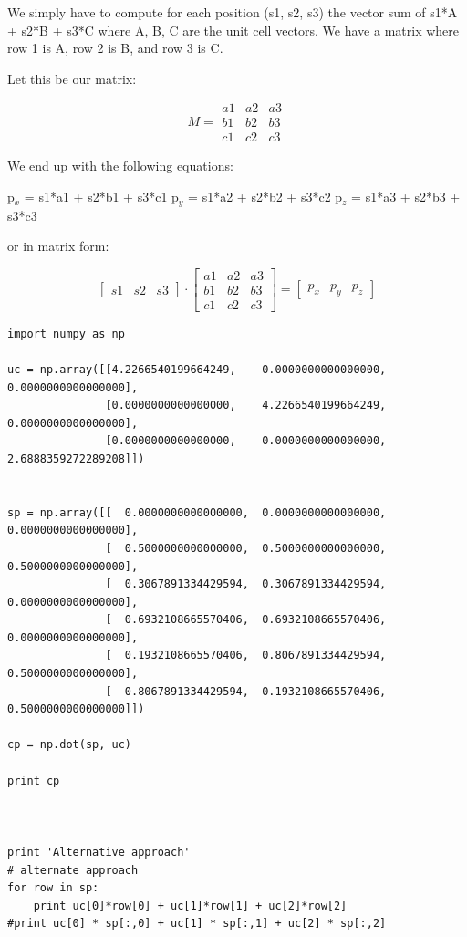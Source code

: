 \documentclass{article}
\begin{document}
We simply have to compute for each position (s1, s2, s3) the vector sum of s1*A + s2*B + s3*C where A, B, C are the unit cell vectors. We have a matrix where row 1 is A, row 2 is B, and row 3 is C.

Let this be our matrix:

\[M = \begin{array}{ccc} a1 & a2 & a3 \\
                       b1 & b2 & b3 \\
                       c1 & c2 & c3 \end{array} \]

We end up with the following equations:

p$_x$ = s1*a1 + s2*b1 + s3*c1
p$_y$ = s1*a2 + s2*b2 + s3*c2
p$_z$ = s1*a3 + s2*b3 + s3*c3

or in matrix form:

\[ [\begin{array}{ccc}s1 & s2 & s3\end{array}] %
               \cdot \left[\begin{array}{ccc} a1 & a2 & a3 \\
               b1 & b2 & b3 \\
               c1 & c2 & c3 \end{array} \right] = [ \begin{array}{ccc} p_x & p_y & p_z\end{array}] \]
   


\begin{verbatim}
import numpy as np

uc = np.array([[4.2266540199664249,    0.0000000000000000,    0.0000000000000000],
               [0.0000000000000000,    4.2266540199664249,    0.0000000000000000],
               [0.0000000000000000,    0.0000000000000000,    2.6888359272289208]])


sp = np.array([[  0.0000000000000000,  0.0000000000000000,  0.0000000000000000],
               [  0.5000000000000000,  0.5000000000000000,  0.5000000000000000],
               [  0.3067891334429594,  0.3067891334429594,  0.0000000000000000],
               [  0.6932108665570406,  0.6932108665570406,  0.0000000000000000],
               [  0.1932108665570406,  0.8067891334429594,  0.5000000000000000],
               [  0.8067891334429594,  0.1932108665570406,  0.5000000000000000]])

cp = np.dot(sp, uc)

print cp



print 'Alternative approach'
# alternate approach
for row in sp:
    print uc[0]*row[0] + uc[1]*row[1] + uc[2]*row[2]
#print uc[0] * sp[:,0] + uc[1] * sp[:,1] + uc[2] * sp[:,2]
\end{verbatim}
\end{document}
